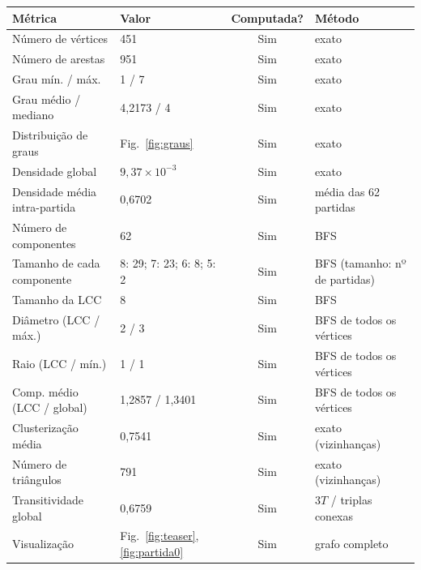 \begin{tabular}{llcl}
  \toprule
  Métrica & Valor & Computada? & Método \\
  \midrule
  Número de vértices & 451 & Sim & exato \\
  Número de arestas & 951 & Sim & exato \\
  Grau mín. / máx. & 1 / 7 & Sim & exato \\
  Grau médio / mediano & 4,2173 / 4 & Sim & exato \\
  Distribuição de graus & Fig.~\ref{fig:graus} & Sim & exato \\
  Densidade global & $9{,}37 \times 10^{-3}$ & Sim & exato \\
  Densidade média intra-partida & 0,6702 & Sim & média das 62 partidas \\
  Número de componentes & 62 & Sim & BFS \\
  Tamanho de cada componente & 8: 29; 7: 23; 6: 8; 5: 2 & Sim & BFS (tamanho: nº de partidas) \\
  Tamanho da LCC & 8 & Sim & BFS \\
  Diâmetro (LCC / máx.) & 2 / 3 & Sim & BFS de todos os vértices \\
  Raio (LCC / mín.) & 1 / 1 & Sim & BFS de todos os vértices \\
  Comp. médio (LCC / global) & 1,2857 / 1,3401 & Sim & BFS de todos os vértices \\
  Clusterização média & 0,7541 & Sim & exato (vizinhanças) \\
  Número de triângulos & 791 & Sim & exato (vizinhanças) \\
  Transitividade global & 0,6759 & Sim & $3T$ / triplas conexas \\
  Visualização & Fig.~\ref{fig:teaser}, \ref{fig:partida0} & Sim & grafo completo \\
  \bottomrule
\end{tabular}
